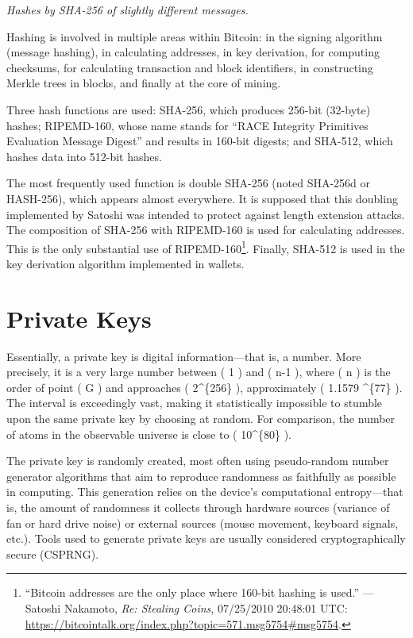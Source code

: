 \documentclass[
  a5paper,
  smalldemyvopaper,10pt,twoside,onecolumn,openright,extrafontsizes,hidelinks]{memoir}
\begin{document}
\emph{Hashes by SHA-256 of slightly different messages.}

Hashing is involved in multiple areas within Bitcoin: in the signing
algorithm (message hashing), in calculating addresses, in key
derivation, for computing checksums, for calculating transaction and
block identifiers, in constructing Merkle trees in blocks, and finally
at the core of mining.

Three hash functions are used: SHA-256, which produces 256-bit (32-byte)
hashes; RIPEMD-160, whose name stands for ``RACE Integrity Primitives
Evaluation Message Digest'' and results in 160-bit digests; and SHA-512,
which hashes data into 512-bit hashes.

The most frequently used function is double SHA-256 (noted SHA-256d or
HASH-256), which appears almost everywhere. It is supposed that this
doubling implemented by Satoshi was intended to protect against length
extension attacks. The composition of SHA-256 with RIPEMD-160 is used
for calculating addresses. This is the only substantial use of
RIPEMD-160\footnote{``Bitcoin addresses are the only place where 160-bit
  hashing is used.'' --- Satoshi Nakamoto, \emph{Re: Stealing Coins},
  07/25/2010 20:48:01 UTC:
  \url{https://bitcointalk.org/index.php?topic=571.msg5754\#msg5754}.}.
Finally, SHA-512 is used in the key derivation algorithm implemented in
wallets.

\section*{Private Keys}\label{private-keys}


Essentially, a private key is digital information---that is, a number.
More precisely, it is a very large number between ( 1 ) and ( n-1 ),
where ( n ) is the order of point ( G ) and approaches ( 2\^{}\{256\} ),
approximately ( 1.1579 \^{}\{77\} ). The interval is
exceedingly vast, making it statistically impossible to stumble upon the
same private key by choosing at random. For comparison, the number of
atoms in the observable universe is close to ( 10\^{}\{80\} ).

The private key is randomly created, most often using pseudo-random
number generator algorithms that aim to reproduce randomness as
faithfully as possible in computing. This generation relies on the
device's computational entropy---that is, the amount of randomness it
collects through hardware sources (variance of fan or hard drive noise)
or external sources (mouse movement, keyboard signals, etc.). Tools used
to generate private keys are usually considered cryptographically secure
(CSPRNG).
\end{document}
